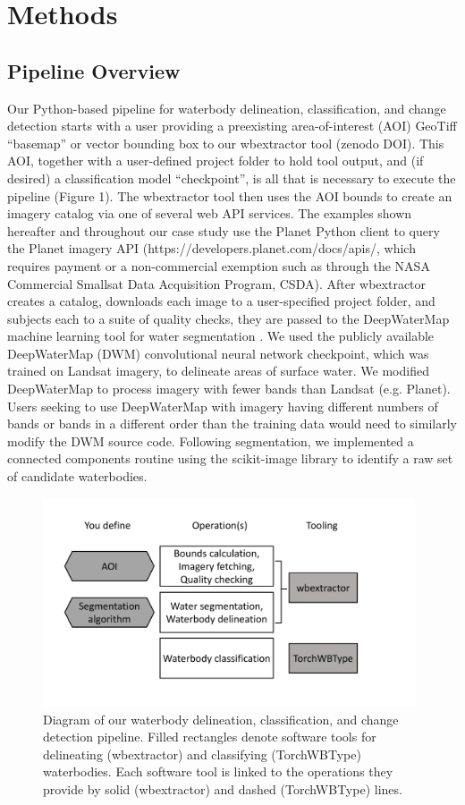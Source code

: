 \documentclass{article}
\begin{document}
\section{Methods}

\subsection{Pipeline Overview}

Our Python-based pipeline for waterbody delineation, classification, and change detection starts with a user providing a preexisting area-of-interest (AOI) GeoTiff “basemap” or vector bounding box to our wbextractor tool (zenodo DOI). This AOI, together with a user-defined project folder to hold tool output, and (if desired) a classification model “checkpoint”, is all that is necessary to execute the pipeline (Figure 1). The wbextractor tool then uses the AOI bounds to create an imagery catalog via one of several web API services. The examples shown hereafter and throughout our case study use the Planet Python client to query the Planet imagery API (https://developers.planet.com/docs/apis/, which requires payment or a non-commercial exemption such as through the NASA Commercial Smallsat Data Acquisition Program, CSDA). After wbextractor creates a catalog, downloads each image to a user-specified project folder, and subjects each to a suite of quality checks, they are passed to the DeepWaterMap machine learning tool for water segmentation \citep{isikdogan2019seeing}. We used the publicly available DeepWaterMap (DWM) convolutional neural network checkpoint, which was trained on Landsat imagery, to delineate areas of surface water. We modified DeepWaterMap to process imagery with fewer bands than Landsat (e.g. Planet). Users seeking to use DeepWaterMap with imagery having different numbers of bands or bands in a different order than the training data would need to similarly modify the DWM source code. Following segmentation, we implemented a connected components routine using the scikit-image library \citep{vanderwalt2014} to identify a raw set of candidate waterbodies.

\begin{figure}
	\centering
	\includegraphics[width=11cm]{../figures/diagram_pipeline}
	\caption{Diagram of our waterbody delineation, classification, and change detection pipeline. Filled rectangles denote software tools for delineating (wbextractor) and classifying (TorchWBType) waterbodies. Each software tool is linked to the operations they provide by solid (wbextractor) and dashed (TorchWBType) lines.}
	\label{fig:diagram_pipeline}
\end{figure}
\end{document}
